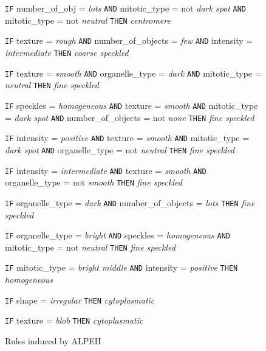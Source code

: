 \begin{figure}
	\caption{Rules induced by ALPEH}
	\label{fig:RulesALEPH}
	\small
	\centering
	
		\begin{algorithmic}[1]
			\State \texttt{IF} number\_of\_obj = \textit{lots} \texttt{AND} mitotic\_type = not \textit{dark spot} \texttt{AND} mitotic\_type = not \textit{neutral}
			\Statex \texttt{THEN} \textit{centromere}
			
			\State \texttt{IF} texture = \textit{rough} \texttt{AND} number\_of\_objects = \textit{few} \texttt{AND} intensity = \textit{intermediate}
			\Statex \texttt{THEN} \textit{coarse speckled}
			
			\State \texttt{IF} texture = \textit{smooth} \texttt{AND} organelle\_type = \textit{dark} \texttt{AND} mitotic\_type = \textit{neutral}
			\Statex \texttt{THEN} \textit{fine speckled}
			
			\State \texttt{IF} speckles = \textit{homogeneous} \texttt{AND} texture = \textit{smooth} \texttt{AND} mitotic\_type = \textit{dark spot} \texttt{AND} number\_of\_objects = not \textit{none}
			\Statex \texttt{THEN} \textit{fine speckled}
			
			\State \texttt{IF} intensity = \textit{positive} \texttt{AND} texture = \textit{smooth} \texttt{AND} mitotic\_type = \textit{dark spot} \texttt{AND} organelle\_type = not \textit{neutral}
			\Statex \texttt{THEN} \textit{fine speckled}
			
			\State \texttt{IF} intensity = \textit{intermediate} \texttt{AND} texture = \textit{smooth}  \texttt{AND} organelle\_type = not \textit{smooth}
			\Statex \texttt{THEN} \textit{fine speckled}
			
			\State \texttt{IF} organelle\_type = \textit{dark} \texttt{AND} number\_of\_objects = \textit{lots}
			\Statex \texttt{THEN} \textit{fine speckled}
			
			\State \texttt{IF} organelle\_type = \textit{bright} \texttt{AND} speckles = \textit{homogeneous} \texttt{AND} mitotic\_type = not \textit{neutral}
			\Statex \texttt{THEN} \textit{fine speckled}
			
			\State \texttt{IF} mitotic\_type = \textit{bright middle} \texttt{AND} intensity = \textit{positive} 
			\Statex \texttt{THEN} \textit{homogeneous}
			
			\State \texttt{IF} shape = \textit{irregular} %
			\Statex \texttt{THEN} \textit{cytoplasmatic}
			
			\State \texttt{IF} texture = \textit{blob} %
			\Statex \texttt{THEN} \textit{cytoplasmatic}
			

\end{algorithmic}
\end{figure}
